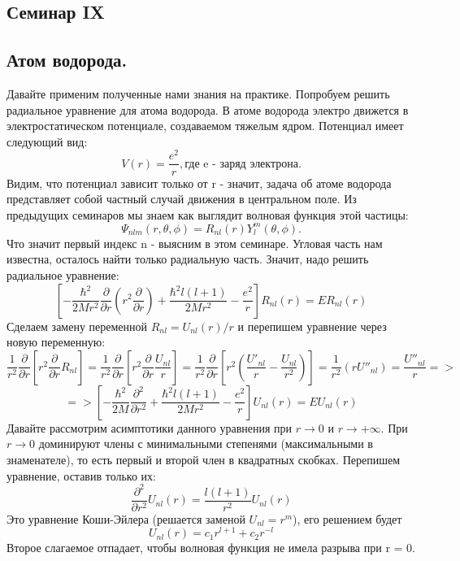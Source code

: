 \begin{center}
    \section{Семинар IX}
\end{center}
\subsection{Атом водорода.}
Давайте применим полученные нами знания на практике. Попробуем решить радиальное уравнение для атома водорода. В атоме водорода электро движется в электростатическом потенциале, создаваемом тяжелым ядром. Потенциал имеет следующий вид:
\[
V(r) = \frac{e^2}{r}, \text{где e - заряд электрона}.
\]
Видим, что потенциал зависит только от r - значит, задача об атоме водорода представляет собой частный случай движения в центральном поле. Из предыдущих семинаров мы знаем как выглядит волновая функция этой частицы:
\[
\Psi_{nlm}(r, \theta, \phi) = R_{nl}(r)Y^m_l(\theta, \phi).
\]
Что значит первый индекс n - выясним в этом семинаре. Угловая часть нам известна, осталось найти только радиальную часть. Значит, надо решить радиальное уравнение:
\[
\left[ -\frac{\hbar^2}{2Mr^2}\frac{\partial}{\partial r}(r^2 \frac{\partial}{\partial r}) + \frac{\hbar^2 l(l+1)}{2Mr^2} - \frac{e^2}{r}\right]R_{nl}(r) = ER_{nl}(r)
\]
Сделаем замену переменной $R_{nl}=U_{nl}(r)/r$ и перепишем уравнение через новую переменную:
\[
\frac{1}{r^2}\frac{\partial}{\partial r}\left[ r^2 \frac{\partial}{\partial r} R_{nl} \right] = \frac{1}{r^2}\frac{\partial}{\partial r}\left[ r^2 \frac{\partial}{\partial r} \frac{U_{nl}}{r} \right] = \frac{1}{r^2}\frac{\partial}{\partial r}\left[ r^2 (\frac{U'_{nl}}{r} - \frac{U_{nl}}{r^2}) \right] =  \frac{1}{r^2}\left(rU''_{nl}\right) = \frac{U''_{nl}}{r} =>
\]
\[
=>  \left[ -\frac{\hbar^2}{2M}\frac{\partial^2}{\partial r^2} + \frac{\hbar^2 l(l+1)}{2Mr^2} - \frac{e^2}{r}\right]U_{nl}(r) = EU_{nl}(r)
\]
Давайте рассмотрим асимптотики данного уравнения при $r \rightarrow 0$ и $r \rightarrow +\infty$. При $r \rightarrow 0$ доминируют члены с минимальными степенями (максимальными в знаменателе), то есть первый и второй член в квадратных скобках. Перепишем уравнение, оставив только их:
\[
\frac{\partial^2}{\partial r^2} U_{nl}(r) = \frac{l(l+1)}{r^2} U_{nl}(r)
\]
Это уравнение Коши-Эйлера (решается заменой $U_{nl} = r^m$), его решением будет
\[
U_{nl}(r) = c_1r^{l+1} + c_2 r^{-l}
\]
Второе слагаемое отпадает, чтобы волновая функция не имела разрыва при r = 0.

